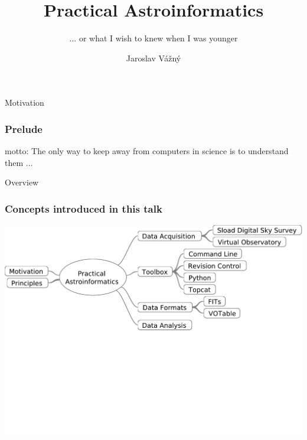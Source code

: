 \documentclass[fleqn]{beamer}
\title[Computers in Science] %
{Practical Astroinformatics}
\subtitle{... or what I wish to knew when I was younger} %
\author[Jaroslav Vážný] %
{Jaroslav Vážný }
\institute[Universities of Somewhere and Elsewhere] %
{

    Masarykova univerzita

}
\begin{document}
 




\begin{frame}
  \titlepage
\end{frame}




\begin{section}{Motivation}     
 \begin{frame}
   \begin{center}
     \frametitle{Prelude}
     \small{motto:  The only way to keep away from computers in science is to understand them ... }
   \end{center}
 \end{frame}
\end{section}


\begin{section}{Overview}
\begin{frame}\frametitle{Concepts introduced in this talk}
  \begin{center}
    \includegraphics[width=1.0\textwidth]{overview}    
  \end{center}
\end{frame}
\end{section}
\end{document}
